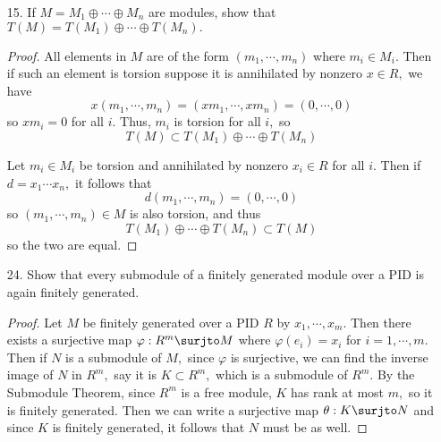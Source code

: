 \documentclass{article}
\begin{document}
\begin{itemize}
\begin{proof}
			$(\impliedby):$ Let $m+K\in M/K$ be torsion and annihilated by nonzero $x\in R,$ so
			\[x(m+K)=xm+K=K\implies xm\in K\]
			Since $K$ is torsion, it follows that $xm$ is also torsion, which means that $m$ is torsion. Thus, since $m\in M$ was arbitrary, $M$ is also torsion.
		\end{proof}

	\item[15.] If $M=M_1\oplus \cdots \oplus M_n$ are modules, show that $T(M)=T(M_1)\oplus\cdots\oplus T(M_n).$
		\begin{proof}
			All elements in $M$ are of the form $(m_1, \cdots, m_n)$ where $m_i\in M_i.$ Then if such an element is torsion suppose it is annihilated by nonzero $x\in R,$ we have
			\[x(m_1, \cdots, m_n)=(xm_1, \cdots, xm_n)=(0, \cdots, 0)\]
			so $xm_i=0$ for all $i.$ Thus, $m_i$ is torsion for all $i,$ so 
			\[T(M)\subset T(M_1)\oplus\cdots\oplus T(M_n)\]

			Let $m_i\in M_i$ be torsion and annihilated by nonzero $x_i\in R$ for all $i.$ Then if $d=x_1\cdots x_n,$ it follows that
			\[d(m_1, \cdots, m_n)=(0, \cdots, 0)\]
			so $(m_1, \cdots, m_n)\in M$ is also torsion, and thus
			\[T(M_1)\oplus\cdots\oplus T(M_n)\subset T(M)\]
			so the two are equal.
		\end{proof}

	\item[24.] Show that every submodule of a finitely generated module over a PID is again finitely generated.
		\begin{proof}
			Let $M$ be finitely generated over a PID $R$ by $x_1, \cdots, x_m.$ Then there exists a surjective map $\varphi:R^m\surjto M$ where $\varphi(e_i)=x_i$ for $i=1, \cdots, m.$ Then if $N$ is a submodule of $M,$ since $\varphi$ is surjective, we can find the inverse image of $N$ in $R^m,$ say it is $K\subset R^m,$ which is a submodule of $R^m.$ By the Submodule Theorem, since $R^m$ is a free module, $K$ has rank at most $m,$ so it is finitely generated. Then we can write a surjective map $\theta: K\surjto N$ and since $K$ is finitely generated, it follows that $N$ must be as well.
		\end{proof}
		
\end{itemize}
\end{document}
